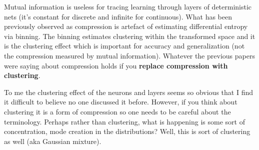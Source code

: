 \begin{notebox}
\tldr Mutual information is useless for tracing learning through layers of deterministic nets (it's constant for discrete and infinite for continuous).
What has been previously observed as compression is artefact of estimating differential entropy via binning.
The binning estimates clustering within the transformed space and it is the clustering effect which is important for accuracy and generalization (not the compression measured by mutual information). Whatever the previous papers were saying about compression holds if you \textbf{replace compression with clustering}.
\end{notebox}

\begin{notebox}
\concl To me the clustering effect of the neurons and layers seems so obvious that I find it difficult to believe no one discussed it before.
However, if you think about clustering it is a form of compression so one needs to be careful about the terminology.
Perhaps rather than clustering, what is happening is some sort of concentration, mode creation in the distributions?
Well, this is sort of clustering as well (aka Gaussian mixture).
\end{notebox}

